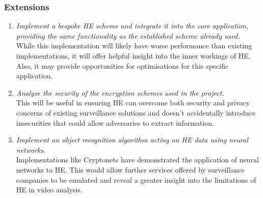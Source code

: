 \subsubsection{Extensions}
\begin{enumerate}[leftmargin=1.75cm,label=\texttt{B\arabic*:}]
    \item \textit{Implement a bespoke HE scheme and integrate it into the core application, providing the same functionality as the established scheme already used.} \smallskip \\ While this implementation will likely have worse performance than existing implementations, it will offer helpful insight into the inner workings of HE. Also, it may provide opportunities for optimisations for this specific application.
    \item \textit{Analyse the security of the encryption schemes used in the project.} \smallskip \\ This will be useful in ensuring HE can overcome both security and privacy concerns of existing surveillance solutions and doesn't accidentally introduce insecurities that could allow adversaries to extract information.
    \item \textit{Implement an object recognition algorithm acting on HE data using neural networks.} \smallskip \\ Implementations like Cryptonets \cite{Dowlin} have demonstrated the application of neural networks to HE. This would allow further services offered by surveillance companies to be emulated and reveal a greater insight into the limitations of HE in video analysis.    
\end{enumerate}

\setlength{\leftskip}{0cm}

